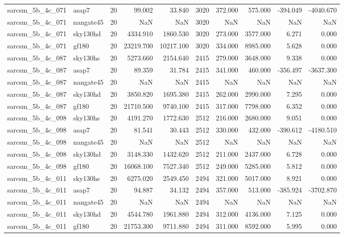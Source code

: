 \begin{longtable}{llrrrrrrrr}
sarcsm\_5b\_4c\_071 & asap7 & 20 & 99.002 & 33.840 & 3020 & 372.000 & 575.000 & -394.049 & -4040.670 \\
sarcsm\_5b\_4c\_071 & nangate45 & 20 & NaN & NaN & 3020 & NaN & NaN & NaN & NaN \\
sarcsm\_5b\_4c\_071 & sky130hd & 20 & 4334.910 & 1860.530 & 3020 & 273.000 & 3577.000 & 6.271 & 0.000 \\
sarcsm\_5b\_4c\_071 & gf180 & 20 & 23219.700 & 10217.100 & 3020 & 334.000 & 8985.000 & 5.628 & 0.000 \\
sarcsm\_5b\_4c\_087 & sky130hs & 20 & 5273.660 & 2154.640 & 2415 & 279.000 & 3648.000 & 9.338 & 0.000 \\
sarcsm\_5b\_4c\_087 & asap7 & 20 & 89.359 & 31.784 & 2415 & 341.000 & 460.000 & -356.497 & -3637.300 \\
sarcsm\_5b\_4c\_087 & nangate45 & 20 & NaN & NaN & 2415 & NaN & NaN & NaN & NaN \\
sarcsm\_5b\_4c\_087 & sky130hd & 20 & 3850.820 & 1695.380 & 2415 & 262.000 & 2990.000 & 7.295 & 0.000 \\
sarcsm\_5b\_4c\_087 & gf180 & 20 & 21710.500 & 9740.100 & 2415 & 317.000 & 7798.000 & 6.352 & 0.000 \\
sarcsm\_5b\_4c\_098 & sky130hs & 20 & 4191.270 & 1772.630 & 2512 & 216.000 & 2680.000 & 9.051 & 0.000 \\
sarcsm\_5b\_4c\_098 & asap7 & 20 & 81.541 & 30.443 & 2512 & 330.000 & 432.000 & -390.612 & -4180.510 \\
sarcsm\_5b\_4c\_098 & nangate45 & 20 & NaN & NaN & 2512 & NaN & NaN & NaN & NaN \\
sarcsm\_5b\_4c\_098 & sky130hd & 20 & 3148.330 & 1432.620 & 2512 & 211.000 & 2437.000 & 6.728 & 0.000 \\
sarcsm\_5b\_4c\_098 & gf180 & 20 & 16068.100 & 7527.340 & 2512 & 249.000 & 5285.000 & 5.812 & 0.000 \\
sarcsm\_5b\_4c\_011 & sky130hs & 20 & 6275.020 & 2549.450 & 2494 & 321.000 & 5017.000 & 8.921 & 0.000 \\
sarcsm\_5b\_4c\_011 & asap7 & 20 & 94.887 & 34.132 & 2494 & 357.000 & 513.000 & -385.924 & -3702.870 \\
sarcsm\_5b\_4c\_011 & nangate45 & 20 & NaN & NaN & 2494 & NaN & NaN & NaN & NaN \\
sarcsm\_5b\_4c\_011 & sky130hd & 20 & 4544.780 & 1961.880 & 2494 & 312.000 & 4136.000 & 7.125 & 0.000 \\
sarcsm\_5b\_4c\_011 & gf180 & 20 & 21753.300 & 9711.880 & 2494 & 311.000 & 8592.000 & 5.995 & 0.000 \\

\end{longtable}
